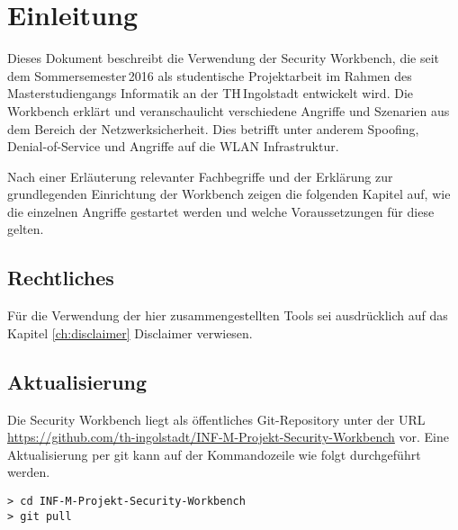 \chapter{Einleitung}

Dieses Dokument beschreibt die Verwendung der Security Workbench, die seit dem Sommersemester\,2016 als studentische Projektarbeit im Rahmen des Masterstudiengangs Informatik an der TH\,Ingolstadt entwickelt wird. Die Workbench erklärt und veranschaulicht verschiedene Angriffe und Szenarien aus dem Bereich der Netzwerksicherheit. Dies betrifft unter anderem Spoofing, Denial-of-Service und Angriffe auf die WLAN Infrastruktur.

Nach einer Erläuterung relevanter Fachbegriffe und der Erklärung zur grundlegenden Einrichtung der Workbench zeigen die folgenden Kapitel auf, wie die einzelnen Angriffe gestartet werden und welche Voraussetzungen für diese gelten.


\section{Rechtliches}

Für die Verwendung der hier zusammengestellten Tools sei ausdrücklich auf das Kapitel \ref{ch:disclaimer} Disclaimer verwiesen.

\section{Aktualisierung}

Die Security Workbench liegt als öffentliches Git-Repository unter der URL \url{https://github.com/th-ingolstadt/INF-M-Projekt-Security-Workbench} vor. Eine Aktualisierung per git kann auf der Kommandozeile wie folgt durchgeführt werden.

\begin{lstlisting}
> cd INF-M-Projekt-Security-Workbench
> git pull
\end{lstlisting}
